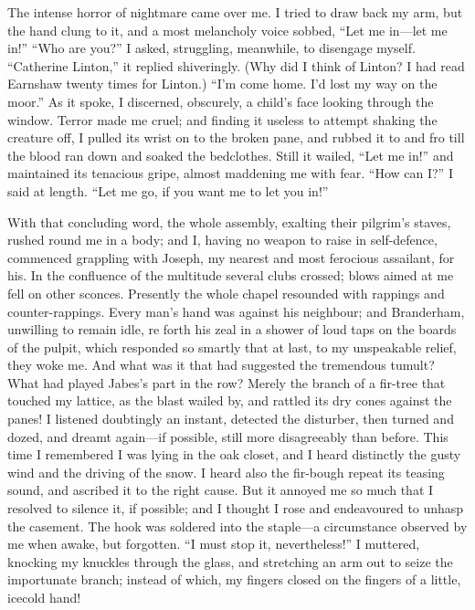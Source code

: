 The intense horror of nightmare came over me.  I tried to draw
back my arm, but the hand clung to it, and a most melancholy voice
sobbed, ``Let me in---let me in!'' ``Who are you?'' I asked, struggling,
meanwhile, to disengage myself. ``Catherine Linton,'' it replied
shiveringly. (Why did I think of Linton? I had read Earnshaw twenty
times for Linton.) ``I'm come home. I'd lost my way on the moor.''  As
it spoke, I discerned, obscurely, a child's face looking through the
window. Terror made me cruel; and finding it useless to attempt shaking
the creature off, I pulled its wrist on to the broken pane, and rubbed
it to and fro till the blood ran down and soaked the bedclothes. Still
it wailed, ``Let me in!'' and maintained its tenacious gripe, almost
maddening me with fear. ``How can I?''  I said at length. ``Let me go,
if you want me to let you in!''

With that concluding word, the whole assembly,
exalting their pilgrim's staves, rushed round me in a body; and I,
having no weapon to raise in self-defence, commenced grappling with
Joseph, my nearest and most ferocious assailant, for his. In the
confluence of the multitude several clubs crossed; blows aimed at me
fell on other sconces. Presently the whole chapel resounded with
rappings and counter-rappings. Every man's hand was against his
neighbour; and Branderham, unwilling to remain idle, re forth his
zeal in a shower of loud taps on the boards of the pulpit, which
responded so smartly that at last, to my unspeakable relief, they woke
me. And what was it that had suggested the tremendous tumult? What had
played Jabes's part in the row?  Merely the branch of a fir-tree that
touched my lattice, as the blast wailed by, and rattled its dry cones
against the panes! I listened doubtingly an instant, detected the
disturber, then turned and dozed, and dreamt again---if possible, still
more disagreeably than before.  This time I remembered I was lying in
the oak closet, and I heard distinctly the gusty wind and the driving of
the snow. I heard also the fir-bough repeat its teasing sound, and
ascribed it to the right cause.  But it annoyed me so much that I
resolved to silence it, if possible; and I thought I rose and
endeavoured to unhasp the casement. The hook was soldered into the
staple---a circumstance observed by me when awake, but forgotten. ``I
must stop it, nevertheless!'' I muttered, knocking my knuckles through
the glass, and stretching an arm out to seize the importunate branch;
instead of which, my fingers closed on the fingers of a little, icecold
hand!


